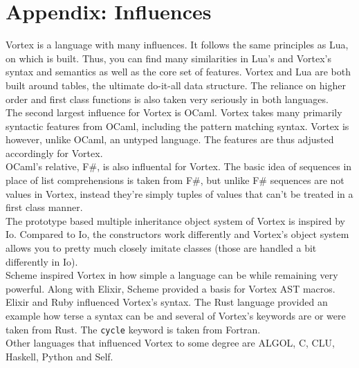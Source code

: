 \documentclass{article}
\begin{document}
\section{Appendix: Influences}
Vortex is a language with many influences. It follows the same principles as
Lua, on which is built. Thus, you can find many similarities in Lua's and
Vortex's syntax and semantics as well as the core set of features. Vortex and
Lua are both built around tables, the ultimate do-it-all data structure.
The reliance on higher order and first class functions is also taken very
seriously in both languages.\\
The second largest influence for Vortex is OCaml. Vortex takes many primarily
syntactic features from OCaml, including the pattern matching syntax. Vortex
is however, unlike OCaml, an untyped language. The features are thus adjusted
accordingly for Vortex.\\
OCaml's relative, F\#, is also influental for Vortex. The basic idea of
sequences in place of list comprehensions is taken from F\#, but unlike
F\# sequences are not values in Vortex, instead they're simply tuples
of values that can't be treated in a first class manner.\\
The prototype based multiple inheritance object system of Vortex is inspired
by Io. Compared to Io, the constructors work differently and Vortex's object
system allows you to pretty much closely imitate classes (those are handled
a bit differently in Io).\\
Scheme inspired Vortex in how simple a language can be while remaining very
powerful. Along with Elixir, Scheme provided a basis for Vortex AST macros.\\
Elixir and Ruby influenced Vortex's syntax. The Rust language provided an
example how terse a syntax can be and several of Vortex's keywords are or
were taken from Rust. The \verb|cycle| keyword is taken from Fortran.\\
Other languages that influenced Vortex to some degree are ALGOL, C, CLU,
Haskell, Python and Self.
\end{document}
